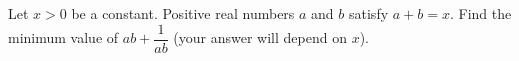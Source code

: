 Let $x>0$ be a constant. Positive real numbers $a$ and $b$ satisfy $a+b=x$. Find the minimum value of $ab+\dfrac{1}{ab}$ (your answer will depend on $x$).
